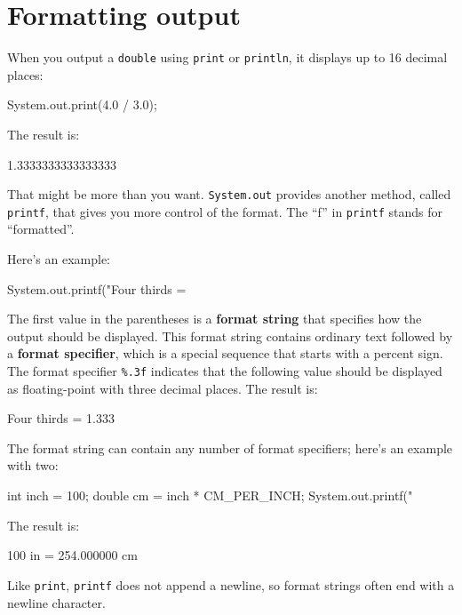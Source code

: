 \documentclass[12pt]{book}
\theoremstyle{exercise}
\newcommand{\java}[1]{\verb"#1"}
\begin{document}
\section{Formatting output}

When you output a \java{double} using \java{print} or \java{println}, it displays up to 16 decimal places:

\begin{code}
    System.out.print(4.0 / 3.0);
\end{code}

The result is:

\begin{stdout}
1.3333333333333333
\end{stdout}

That might be more than you want.
\java{System.out} provides another method, called \java{printf}, that gives you more control of the format.
The ``f'' in \java{printf} stands for ``formatted''.

Here's an example:

\begin{code}
    System.out.printf("Four thirds = %
\end{code}


The first value in the parentheses is a {\bf format string} that specifies how the output should be displayed.
This format string contains ordinary text followed by a {\bf format specifier}, which is a special sequence that starts with a percent sign.
The format specifier \verb"%.3f" indicates that the following value should be displayed as floating-point with three decimal places.
The result is:

\begin{stdout}
Four thirds = 1.333
\end{stdout}

The format string can contain any number of format specifiers; here's an example with two:

\begin{code}
    int inch = 100;
    double cm = inch * CM_PER_INCH;
    System.out.printf("%
\end{code}

The result is:

\begin{stdout}
100 in = 254.000000 cm
\end{stdout}

Like \java{print}, \java{printf} does not append a newline, so format strings often end with a newline character.
\end{document}

